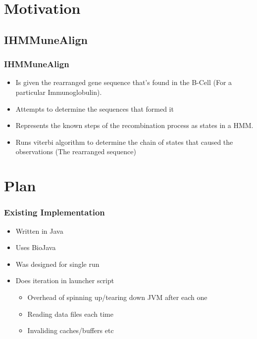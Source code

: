\documentclass{beamer}
\begin{document}
\section{Motivation}

\subsection{IHMMuneAlign}

\begin{frame}
\frametitle{IHMMuneAlign}
\begin{itemize}
 \item Is given the rearranged gene sequence that's found in the B-Cell (For a particular Immunoglobulin).
 \item Attempts to determine the sequences that formed it
 \item Represents the known steps of the recombination process as states in a HMM.
 \item Runs viterbi algorithm to determine the chain of states that caused the observations (The rearranged sequence)
\end{itemize}
\end{frame}


\section{Plan}
\begin{frame}
\frametitle{Existing Implementation}
\begin{itemize}
 \item Written in Java
 \item Uses BioJava
 \item Was designed for single run
 \item Does iteration in launcher script
 \begin{itemize}
  \item Overhead of spinning up/tearing down JVM after each one
  \item Reading data files each time
  \item Invaliding caches/buffers etc
 \end{itemize}

\end{itemize}


\end{frame}
\end{document}

